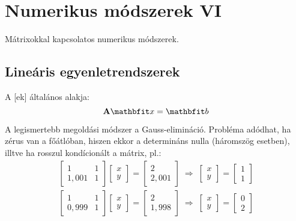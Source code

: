 \documentclass[../../main.tex]{subfiles}
\begin{document}
\section{Numerikus módszerek VI}

\begin{fulltheorem}
  Mátrixokkal kapcsolatos numerikus módszerek.
\end{fulltheorem}

\subsection{Lineáris egyenletrendszerek}

A [ek] általános alakja:
\[
  \rmat A \rvec x = \rvec b
\]

A legismertebb megoldási módszer a Gauss-elimináció. Probléma adódhat, ha
zérus van a főátlóban, hiszen ekkor a determináns nulla (háromszög esetben),
illtve ha rosszul kondícionált a mátrix, pl.:
\begin{gather*}
  \begin{bmatrix}
    1     & 1 \\
    1,001 & 1
  \end{bmatrix} \begin{bmatrix}
    x \\ y
  \end{bmatrix} = \begin{bmatrix}
    2 \\ 2,001
  \end{bmatrix} \; \Rightarrow \; \begin{bmatrix}
    x \\ y
  \end{bmatrix} = \begin{bmatrix}
    1 \\ 1
  \end{bmatrix}
  \\
  \begin{bmatrix}
    1     & 1 \\
    0,999 & 1
  \end{bmatrix} \begin{bmatrix}
    x \\ y
  \end{bmatrix} = \begin{bmatrix}
    2 \\ 1,998
  \end{bmatrix} \; \Rightarrow \; \begin{bmatrix}
    x \\ y
  \end{bmatrix} = \begin{bmatrix}
    0 \\ 2
  \end{bmatrix}
\end{gather*}
\end{document}
